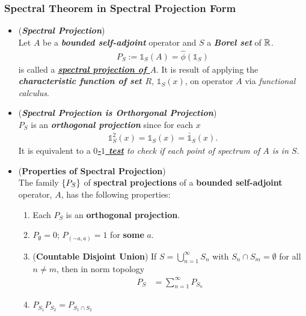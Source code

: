\documentclass[11pt]{article}
\begin{document}
\subsubsection{Spectral Theorem in Spectral Projection Form}
\begin{itemize}
\item \begin{definition} (\emph{\textbf{Spectral Projection}})\\
Let $A$ be a \textbf{\emph{bounded self-adjoint}} operator and $S$ a \emph{\textbf{Borel set}} of ${\mathbb R}$. 
\begin{align*}
P_{S} := \mathds{1}_{S}(A) = \widehat{\phi}( \mathds{1}_{S})
\end{align*} is called a  \underline{\emph{\textbf{spectral projection of $A$}}}. It is result of applying the \emph{\textbf{characteristic function of set $R$}}, $\mathds{1}_{S}(x)$, on operator $A$ via \emph{functional calculus}.
\end{definition}

\item \begin{remark} (\emph{\textbf{Spectral Projection is Orthorgonal Projection}})\\
$P_{S}$ is an \emph{\textbf{orthogonal projection}} since for each $x$
\begin{align*}
\mathds{1}_{S}^2(x) = \mathds{1}_{S}(x) = \bar{\mathds{1}}_{S}(x).
\end{align*} It is equivalent to a \emph{\textbf{\underline{$0$-$1$ test}}  to check if each point of spectrum of $A$ is in $S$}.
\end{remark}

\item \begin{proposition}  (\textbf{Properties of Spectral Projection}) \citep{reed1980methods}\\
The family $\left\{P_{S}\right\}$ of \textbf{spectral projections} of a \textbf{bounded self-adjoint} operator, $A$, has the following properties: 
\begin{enumerate}
\item Each $P_{S}$ is an \textbf{orthogonal projection}. 
\item $P_{\emptyset} = 0$;  $P_{(-a, a)} = 1$ for \textbf{some} $a$.
\item (\textbf{Countable Disjoint Union}) If $S = \bigcup_{n=1}^{\infty}S_n$ with $S_n \cap S_{m} = \emptyset$ for all $n \neq m$, then in norm topology
\begin{align*}
P_{S} &= \sum_{n=1}^{\infty}P_{S_n}
\end{align*}
\item $P_{S_1}P_{S_2} = P_{S_1 \cap S_2}$
\end{enumerate}
\end{proposition}


\end{itemize}
\end{document}
